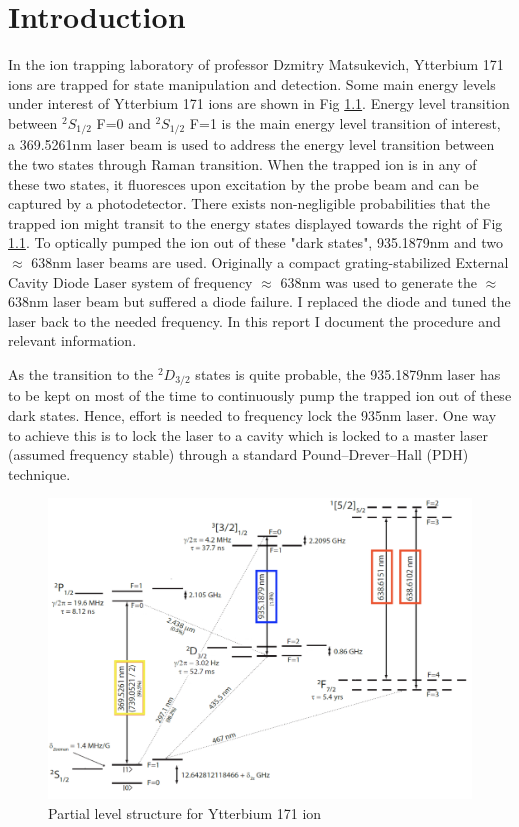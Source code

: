 \documentclass[12pt]{report}
\begin{document}
\chapter{Introduction}
In the ion trapping laboratory of professor Dzmitry Matsukevich, Ytterbium 171 ions are trapped for state manipulation and detection. Some main energy levels under interest of Ytterbium 171 ions are shown in Fig \ref{fig:Yitterbium171Ion}. Energy level transition between  $^2 S_{1/2}$ F=0 and $^2 S_{1/2}$ F=1 is the main energy level transition of interest, a 369.5261nm laser beam is used to address the energy level transition between the two states through Raman transition. When the trapped ion is in any of these two states, it fluoresces upon excitation by the probe beam and can be captured by a photodetector. There exists non-negligible probabilities that the trapped ion might transit to the energy states displayed towards the right of Fig \ref{fig:Yitterbium171Ion}. To optically pumped the ion out of these "dark states", 935.1879nm and two $\approx$ 638nm laser beams are used. Originally a compact grating-stabilized External Cavity Diode Laser system of frequency $\approx$ 638nm was used to generate the $\approx$ 638nm laser beam but suffered a diode failure. I replaced the diode and tuned the laser back to the needed frequency. In this report I document the procedure and relevant information. 
\par
As the transition to the $^2 D_{3/2}$ states is quite probable, the 935.1879nm laser has to be kept on most of the time to continuously pump the trapped ion out of these dark states. Hence, effort is needed to frequency lock the 935nm laser. One way to achieve this is to lock the laser to a cavity which is locked to a master laser (assumed frequency stable) through a standard Pound–Drever–Hall (PDH) technique. 

\begin{figure}[H]
    \centering
    \includegraphics[width=\textwidth]{Yitterbium171Ion.png}
    \caption{Partial level structure for Ytterbium 171 ion \cite{DemonstrationOfRabi-FlopsWithYtterbium171Trapped-IonQubits}
    }
    \label{fig:Yitterbium171Ion}
\end{figure}
\end{document}
